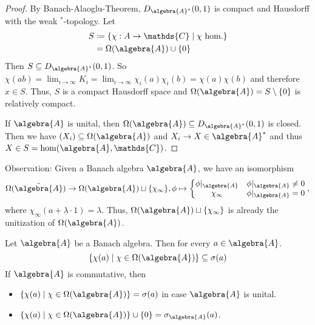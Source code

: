 \documentclass[a4paper]{article}
\begin{document}
\begin{proof}
	By Banach-Alaoglu-Theorem, $D_{\algebra{A}^*}(0,1)$ is compact and Hausdorff with the weak $^*$-topology.
	Let
	\begin{align*}
		S & \coloneq \{\chi: A \to \mathds{C} \mid \chi \text{ hom.} \} \\
		  & = \Omega(\algebra{A}) \cup \{0\}
	\end{align*}
	Then $S \subseteq D_{\algebra{A}^*}(0,1)$.
	So $\chi(ab) = \lim_{i \to \infty} K_i = \lim_{i \to \infty} \chi_i(a) \chi_i(b) = \chi(a) \chi(b)$ and therefore $x \in S$.
	Thus, $S$ is a compact Hausdorff space and $\Omega(\algebra{A}) = S \setminus \{0\}$ is relatively compact.

	If $\algebra{A}$ is unital, then $\Omega(\algebra{A}) \subseteq D_{\algebra{A}^*}(0,1)$ is closed. Then we have $(X_i) \subseteq \Omega(\algebra{A})$ and $X_i \to X \in \algebra{A}^*$ and thus $X \in S = \hom(\algebra{A}, \mathds{C})$.
\end{proof}

Observation: Given a Banach algebra $\algebra{A}$, we have an isomorphism
\begin{equation*}
	\Omega(\tilde{\algebra{A}}) \to \Omega(\algebra{A}) \sqcup \{ \chi_\infty\}, \phi \mapsto \left\{  \begin{matrix}
		\phi|_\algebra{A} & \phi|_{\algebra{A}} \neq 0 \\
		\chi_\infty       & \phi|_\algebra{A} = 0
	\end{matrix}\right. \text{,} \label{obs:unitization_iso}
\end{equation*}
where $\chi_\infty(a + \lambda \cdot 1) = \lambda$. Thus, $\Omega(\algebra{A}) \sqcup \{\chi_\infty\}$ is already the unitization of $\Omega(\algebra{A})$.

\begin{theorem}
	Let $\algebra{A}$ be a Banach algebra. Then for every $a \in \algebra{A}$.
	\begin{equation*}
		\{ \chi (a) \mid \chi \in \Omega(\algebra{A}) \} \subseteq \sigma(a)
	\end{equation*}
	If $\algebra{A}$ is commutative, then
	\begin{itemize}
		\item $\{ \chi(a) \mid \chi \in \Omega(\algebra{A})\} = \sigma(a)$ in case $\algebra{A}$ is unital.
		\item $\{ \chi(a) \mid \chi \in \Omega(\algebra{A})\} \cup \{0\} = \sigma_{\algebra{A}}(a)$.
	\end{itemize}
\end{theorem}
\end{document}
